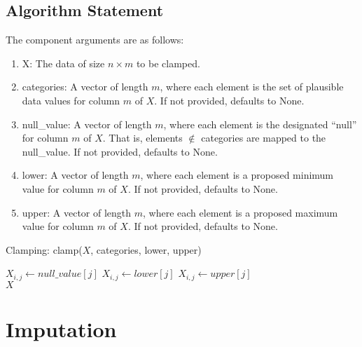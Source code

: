 \documentclass[11pt]{scrartcl} %
\begin{document}
\subsection{Algorithm Statement}
The component arguments are as follows:
\begin{enumerate}
    \item X: The data of size $n \times m$ to be clamped.
    \item categories: A vector of length $m$, where each element is the set of plausible data values 
                      for column $m$ of $X$. If not provided, defaults to None.
    \item null\_value: A vector of length $m$, where each element is the designated ``null'' 
                      for column $m$ of $X$. That is, elements $\not\in$ categories are mapped to the 
                      null\_value. If not provided, defaults to None.
    \item lower: A vector of length $m$, where each element is a proposed minimum value for column $m$ of $X$.
                 If not provided, defaults to None.
    \item upper: A vector of length $m$, where each element is a proposed maximum value for column $m$ of $X$.
                 If not provided, defaults to None. 
\end{enumerate}

\begin{algorithm}[H]
    \label{alg:clamping}
    \caption{Clamping: clamp($X$, categories, lower, upper)}
    \begin{algorithmic}[1]
         
             
                 
                        \State $X_{i,j} \gets null\_value[j]$
                    \EndIf
                \Else {}
                        \State $X_{i,j} \gets lower[j]$
                        \State $X_{i,j} \gets upper[j]$
                    \EndIf
                \EndIf
            \EndFor
        \EndFor
        \\ \Return $X$
    \end{algorithmic}
\end{algorithm}

\section{Imputation} 
\label{sec:impute}
\end{document}
